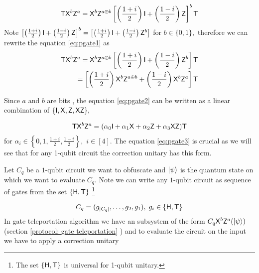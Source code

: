 \begin{equation}
\label{eq:pgate1}
{\sf T} {\sf X}^b {\sf Z}^a={\sf X}^b {\sf Z}^{a\oplus b}\left[\left(\frac{1+i}{2}\right) {\sf I} + \left(\frac{1-i}{2}\right){\sf Z}\right]^b {\sf T}
\end{equation}
Note  $\left[\left(\frac{1+i}{2}\right) {\sf I} + \left(\frac{1-i}{2}\right){\sf Z}\right]^b=\left[\left(\frac{1+i}{2}\right) {\sf I} + \left(\frac{1-i}{2}\right){\sf Z}^b\right]$ for $b \in \{0,1\},$ therefore we can rewrite the equation \ref{eq:pgate1} as
\begin{equation}
\label{eq:pgate2}
\begin{aligned}
{\sf T} {\sf X}^b {\sf Z}^a={\sf X}^b {\sf Z}^{a\oplus b}\left[\left(\frac{1+i}{2}\right) {\sf I} + \left(\frac{1-i}{2}\right){\sf Z}^b\right] {\sf T} \\
=\left[\left(\frac{1+i}{2}\right) {\sf X}^b {\sf Z}^{a\oplus b} + \left(\frac{1-i}{2}\right){\sf X}^b {\sf Z}^a\right] {\sf T} \\
\end{aligned}
\end{equation}

Since $a$ and $b$ are bits , the equation \ref{eq:pgate2} can be written as a linear combination of $\{{\sf I}, {\sf X}, {\sf Z}, {\sf X} {\sf Z}\},$

\begin{equation}
\label{eq:pgate3}
\begin{aligned}
{\sf T} {\sf X}^b {\sf Z}^a= (\alpha_0 {\sf I} +  \alpha_1 {\sf X} + \alpha_2 {\sf Z} + \alpha_3 {\sf X}{\sf Z}){\sf T} \\
\end{aligned}
\end{equation}
for   $\alpha_i \in\left\{0,1, \frac{1+i}{2}, \frac{1-i}{2}\right\},$  $i\in[4].$ The equation \ref{eq:pgate3} is crucial as we will see that for any 1-qubit circuit the correction unitary has this form. 


Let $C_q$ be a $1$-qubit circuit we want to obfuscate and ${\lvert}\psi\rangle$ is the quantum state on which we want to evaluate $C_q.$ Note we can write any $1$-qubit circuit as sequence of gates from the set $\{{\sf H}, {\sf T}\}$ \footnote{The set $\{{\sf H},  {\sf T}\}$ is universal for 1-qubit unitary.}

$$C_q=(g_{|C_q|},\ldots,g_2,g_1 ),\; g_i\in\{{\sf H}, {\sf T}\}$$
In gate teleportation algorithm we  have an subsystem of the form $C_q {\sf X}^b{\sf Z}^a ({\lvert}\psi\rangle)$ (section \ref{protocol: gate  teleportation} ) and to evaluate the circuit on the input we have to apply a correction unitary

